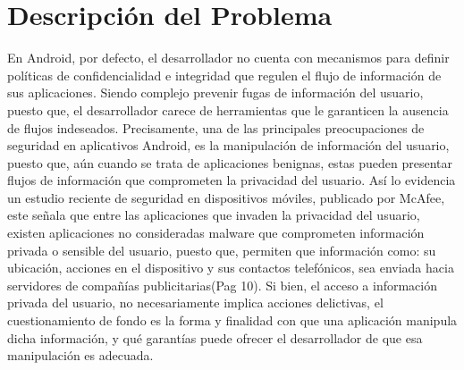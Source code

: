 \section{Descripción del Problema}
\label{sec:problema}
En Android, por defecto, el desarrollador no cuenta con mecanismos para definir
políticas de confidencialidad e integridad que regulen el flujo de información
de sus aplicaciones. Siendo complejo prevenir fugas de información del usuario,
puesto que, el desarrollador carece de herramientas que le garanticen la
ausencia de flujos indeseados. \newline
Precisamente, una de las principales preocupaciones de seguridad en aplicativos
Android, es la manipulación de información del usuario, puesto que, aún cuando
se trata de aplicaciones benignas, estas pueden presentar flujos de información
que comprometen la privacidad del usuario. \newline
Así lo evidencia un estudio reciente de seguridad en dispositivos móviles,
publicado por McAfee\cite{McAfeeReport}, este señala que entre las aplicaciones
que invaden la privacidad del usuario, existen aplicaciones no consideradas
malware que comprometen información privada o sensible del usuario,
puesto que, permiten que información como: su ubicación,
acciones en el dispositivo y sus contactos telefónicos, sea enviada hacia
servidores de compañías publicitarias\cite{McAfeeReport}(Pag 10).\newline
% 
% 
Si bien, el acceso a información privada del usuario, no necesariamente
implica acciones delictivas, el cuestionamiento de
fondo es la forma y finalidad con que una aplicación manipula dicha información,
y qué garantías puede ofrecer el desarrollador de que esa manipulación es
adecuada.


